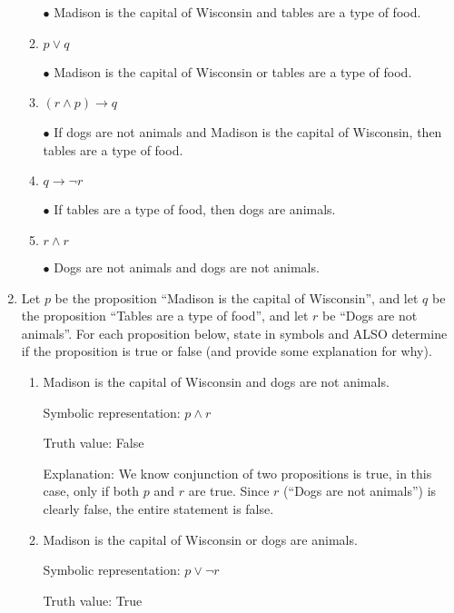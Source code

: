 \documentclass{article}
\begin{document}
\begin{enumerate}
\begin{enumerate}
               $\bullet$ Madison is the capital of Wisconsin and tables are a type of food.

          \item $p \vee q$

               $\bullet$ Madison is the capital of Wisconsin or tables are a type of food.

          \item $(r \wedge p) \rightarrow q$

              $\bullet$ If dogs are not animals and Madison is the capital of Wisconsin, then tables are a type of food.

          \item $q \rightarrow \neg r$

               $\bullet$ If tables are a type of food, then dogs are animals.

          \item $r \wedge r$

               $\bullet$ Dogs are not animals and dogs are not animals.

        \end{enumerate}

  \item
        Let $p$ be the proposition ``Madison is the capital of Wisconsin'', and let $q$ be the proposition ``Tables are a type of food'', and let $r$ be ``Dogs are not animals''. For each proposition below, state in symbols and ALSO determine if the proposition is true or false (and provide some explanation for why).
        \begin{enumerate}
          \item Madison is the capital of Wisconsin and dogs are not animals.

                Symbolic representation: $p \wedge r$

                Truth value: False
                
                Explanation: We know conjunction of two propositions is true, in this case, only if both $p$ and $r$ are true. Since $r$ (``Dogs are not animals'') is clearly false, the entire statement is false.

          \item Madison is the capital of Wisconsin or dogs are animals.

                Symbolic representation: $p \vee \neg r$

                Truth value: True
                

\end{enumerate}
\end{enumerate}
\end{document}
